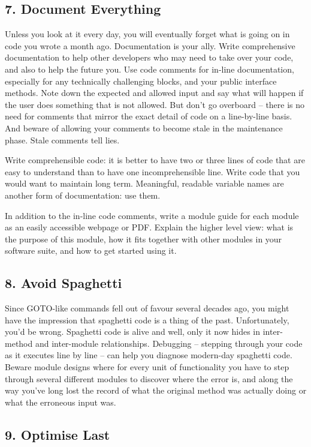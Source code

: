 \documentclass{bmcart}
\begin{document}
\subsection*{7. Document Everything}

Unless you look at it every day, you will eventually forget what is going on in code you wrote a month ago. Documentation is your ally. Write comprehensive documentation to help other developers who may need to take over your code, and also to help the future you. Use code comments for in-line documentation, especially for any technically challenging blocks, and your public interface methods. Note down the expected and allowed input and say what will happen if the user does something that is not allowed. But don't go overboard -- there is no need for comments that mirror the exact detail of code on a line-by-line basis. And beware of allowing your comments to become stale in the maintenance phase. Stale comments tell lies. 

Write comprehensible code: it is better to have two or three lines of code that are easy to understand than to have one incomprehensible line. Write code that you would want to maintain long term. Meaningful, readable variable names are another form of documentation: use them. 

In addition to the in-line code comments, write a module guide for each module as an easily accessible webpage or PDF. Explain the higher level view: what is the purpose of this module, how it fits together with other modules in your software suite, and how to get started using it. 

\subsection*{8. Avoid Spaghetti}

Since GOTO-like commands fell out of favour several decades ago, you might have the impression that spaghetti code is a thing of the past. Unfortunately, you'd be wrong. Spaghetti code is alive and well, only it now hides in inter-method and inter-module relationships. Debugging -- stepping through your code as it executes line by line -- can help you diagnose modern-day spaghetti code. Beware module designs where for every unit of functionality you have to step through several different modules to discover where the error is, and along the way you've long lost the record of what the original method was actually doing or what the erroneous input was. 

\subsection*{9. Optimise Last}
\end{document}
